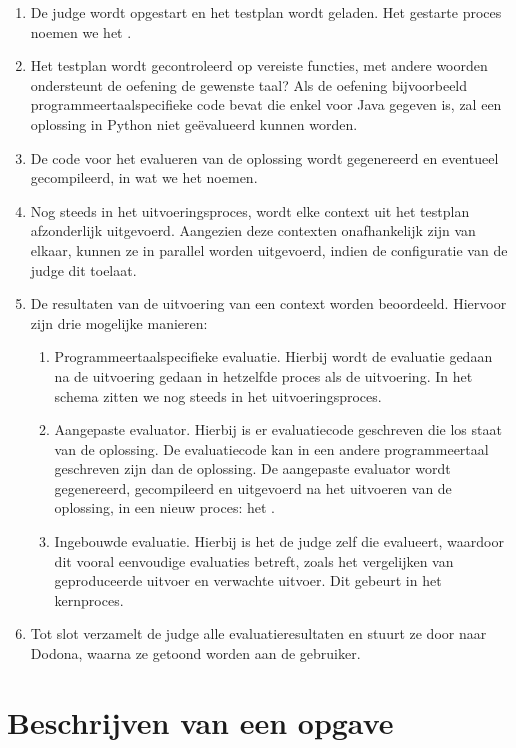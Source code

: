 \begin{enumerate}
    \item De judge wordt opgestart en het testplan wordt geladen.
    Het gestarte proces noemen we het .
    \item Het testplan wordt gecontroleerd op vereiste functies, met andere woorden ondersteunt de oefening de gewenste taal?
    Als de oefening bijvoorbeeld programmeertaalspecifieke code bevat die enkel voor Java gegeven is, zal een oplossing in Python niet geëvalueerd kunnen worden.
    \item De code voor het evalueren van de oplossing wordt gegenereerd en eventueel gecompileerd, in wat we het  noemen.
    \item Nog steeds in het uitvoeringsproces, wordt elke context uit het testplan afzonderlijk uitgevoerd.
    Aangezien deze contexten onafhankelijk zijn van elkaar, kunnen ze in parallel worden uitgevoerd, indien de configuratie van de judge dit toelaat.
    \item De resultaten van de uitvoering van een context worden beoordeeld.
    Hiervoor zijn drie mogelijke manieren:
    \begin{enumerate}
        \item Programmeertaalspecifieke evaluatie.
        Hierbij wordt de evaluatie gedaan na de uitvoering gedaan in hetzelfde proces als de uitvoering.
        In het schema zitten we nog steeds in het uitvoeringsproces.
        \item Aangepaste evaluator.
        Hierbij is er evaluatiecode geschreven die los staat van de oplossing.
        De evaluatiecode kan in een andere programmeertaal geschreven zijn dan de oplossing.
        De aangepaste evaluator wordt gegenereerd, gecompileerd en uitgevoerd na het uitvoeren van de oplossing, in een nieuw proces: het .
        \item Ingebouwde evaluatie.
        Hierbij is het de judge zelf die evalueert, waardoor dit vooral eenvoudige evaluaties betreft, zoals het vergelijken van geproduceerde uitvoer en verwachte uitvoer.
        Dit gebeurt in het kernproces.
    \end{enumerate}
    \item Tot slot verzamelt de judge alle evaluatieresultaten en stuurt ze door naar Dodona, waarna ze getoond worden aan de gebruiker.
\end{enumerate}


\section{Beschrijven van een opgave}\label{sec:testplan}

